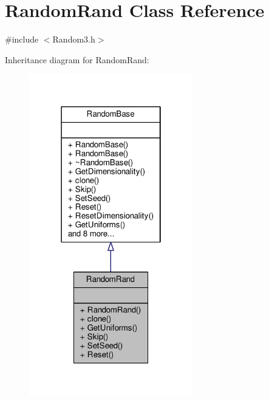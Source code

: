 \hypertarget{classRandomRand}{}\section{Random\+Rand Class Reference}
\label{classRandomRand}


{\ttfamily \#include $<$Random3.\+h$>$}



Inheritance diagram for Random\+Rand\+:
\nopagebreak
\begin{figure}[H]
\begin{center}
\leavevmode
\includegraphics[width=202pt]{classRandomRand__inherit__graph}
\end{center}
\end{figure}


